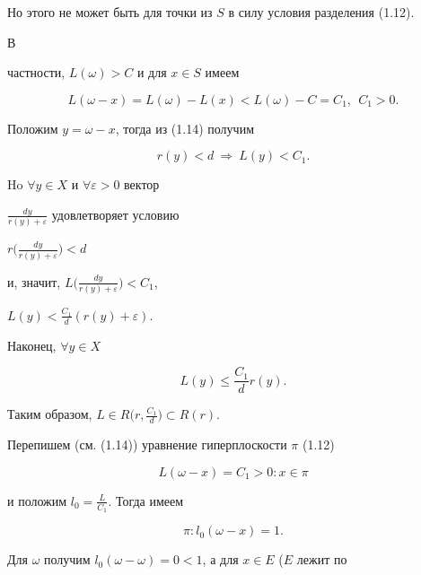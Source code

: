 \begin{pf}
Но этого не может быть для точки из $S$ в силу условия разделения (1.12). 


В 


частности, $L(\omega)>C$ и для $x\in S$ имеем 


\begin{equation} 


L(\omega-x)=L(\omega)-L(x)<L(\omega)-C=C_1,\ \ C_1>0. 


\end{equation} 


Положим $y=\omega-x$, тогда из (1.14) получим 


\begin{equation} 


r(y)<d\ \Longrightarrow\ L(y)<C_1. 


\end{equation} 


Ho $\forall y\in X$ и $\forall\varepsilon>0$ вектор 


$\frac{dy}{r(y)+\varepsilon}$ удовлетворяет условию 


$r\big(\frac{dy}{r(y)+\varepsilon}\big)<d$ 


и, значит, $L\big(\frac{dy}{r(y)+\varepsilon}\big)<C_1$, 


$L(y)<\frac{C_1}{d}(r(y)+\varepsilon)$. 


Наконец, $\forall y\in X$ 


\begin{equation} 


L(y)\le\frac{C_1}{d}r(y). 


\end{equation} 


Таким образом, $L\in R\big(r,\frac{C_1}{d}\big)\subset R(r)$. 


Перепишем (см. (1.14)) уравнение гиперплоскости $\pi$ (1.12) 


\begin{equation} 


L(\omega-x)=C_1>0:x\in \pi 


\end{equation} 


и положим $l_0=\frac{L}{C_1}$. Тогда имеем


\begin{equation} 


\pi:l_0(\omega-x)=1. 


\end{equation} 


Для $\omega$ получим $l_0(\omega-\omega)=0<1$, а для $x\in E$ ($E$ лежит по 



\end{pf}
